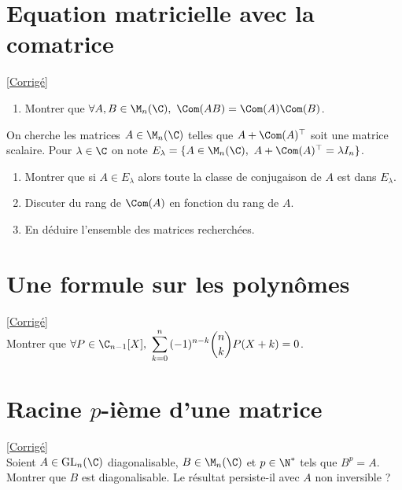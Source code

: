 \documentclass[8pt]{book}
\begin{document}
	\section{Equation matricielle avec la comatrice }
	\label{Equation matricielle avec la comatrice}
	\textcolor{blue}{\hyperref[Equation matricielle avec la comatrice corrigé]{[Corrigé]}}\\
	\begin{enumerate}[leftmargin=*]
		\item Montrer que $\forall A,B\in \M_n(\C),\ \Com(AB)=\Com(A)\Com(B)$.
	\end{enumerate}
	On cherche les matrices $A\in \M_n(\C)$ telles que $A+\Com(A)^\top$ soit une matrice scalaire. Pour $\lambda\in \C$ on note $E_\lambda=\{A\in \M_n(\C),\ A+\Com(A)^\top=\lambda I_n\}$.
	\begin{enumerate}[resume]
		\item Montrer que si $A\in E_\lambda$ alors toute la classe de conjugaison de $A$ est dans $E_\lambda$.
		\item Discuter du rang de $\Com(A)$ en fonction du rang de $A$.
		\item En déduire l'ensemble des matrices recherchées.
	\end{enumerate}
	
	\section{Une formule sur les polynômes }
	\label{Une formule sur les polynômes}
	\textcolor{blue}{\hyperref[Une formule sur les polynômes corrigé]{[Corrigé]}}\\
	Montrer que $\forall P\in \C_{n-1}[X],\ \displaystyle\sum\limits_{k=0}^n{(-1)^{n-k}\binom{n}{k}P(X+k)=0}$.
	
	\section{Racine $p$-ième d'une matrice }
	\label{Racine pieme d'une matrice}
	\textcolor{blue}{\hyperref[Racine pieme d'une matrice corrigé]{[Corrigé]}}\\
	Soient $A\in \text{GL}_n(\C)$ diagonalisable, $B\in \M_n(\C)$ et $p\in \N^*$ tels que $B^p=A$.\\
	Montrer que $B$ est diagonalisable. Le résultat persiste-il avec $A$ non inversible ?
	
\end{document}
